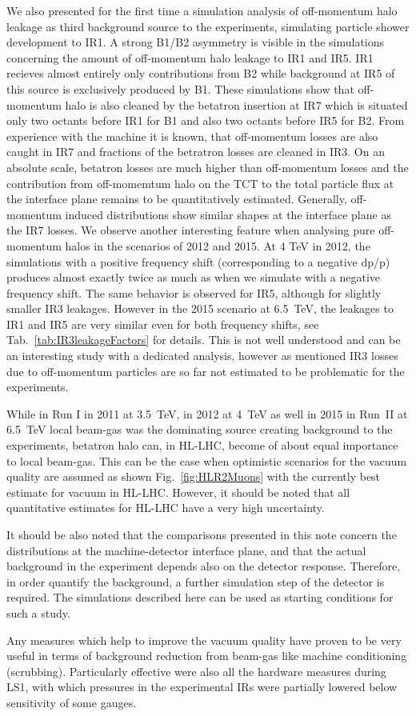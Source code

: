 We also presented for the first time a simulation analysis of off-momentum halo leakage as third background source to the experiments, simulating particle shower development to IR1. A strong B1/B2 asymmetry is visible in the simulations concerning the amount of off-momentum halo leakage to IR1 and IR5. IR1 recieves almost entirely only contributions from B2 while background at IR5 of this source is exclusively produced by B1. These simulations show that off-momentum halo is also cleaned by the betatron insertion at IR7 which is situated only two octants before IR1 for B1 and also two octants before IR5 for B2. From experience with the machine it is known, that off-momentum losses are also caught in IR7 and fractions of the betratron losses are cleaned in IR3. On an absolute scale, betatron losses are much higher than off-momentum losses and the contribution from off-momemtum halo on the TCT to the total particle flux at the interface plane remains to be quantitatively estimated.
Generally, off-momentum induced distributions show similar shapes at the interface plane as the IR7 losses. We observe another interesting feature when analysing pure off-momentum halos in the scenarios of 2012 and 2015. At 4 TeV in 2012, the simulations with a positive frequency shift (corresponding to a negative dp/p) produces almost exactly twice as much as when we simulate with a negative frequency shift. The same behavior is observed for IR5, although for slightly smaller IR3 leakages. However in the 2015 scenario at 6.5~TeV, the leakages to IR1 and IR5 are very similar even for both frequency shifts, see Tab.~\ref{tab:IR3leakageFactors} for details. This is not well understood and can be an interesting study with a dedicated analysis, however as mentioned IR3 losses due to off-momentum particles are so far not estimated to be problematic for the experiments. 


While in Run I in 2011 at 3.5~TeV, in 2012 at 4~TeV as well in 2015 in Run~II at 6.5~TeV local beam-gas was the dominating source creating background to the experiments, betatron halo can, in HL-LHC, become of about equal importance to local beam-gas. This can be the case when optimistic scenarios for the vacuum quality are assumed as shown Fig.~\ref{fig:HLR2Muons} with the currently best estimate for vacuum in HL-LHC. However, it should be noted that all quantitative estimates for HL-LHC have a very high uncertainty.

It should be also noted that the comparisons presented in this note concern the distributions at the machine-detector interface plane, and that the actual background in the experiment depends also on the detector response. Therefore, in order quantify the background, a further simulation step of the detector is required. The simulations described here can be used as starting conditions for such a study.

Any measures which help to improve the vacuum quality have proven to be very useful in terms of background reduction from beam-gas like machine conditioning (scrubbing). Particularly effective were also all the hardware measures during LS1, with which pressures in the experimental IRs were partially lowered below sensitivity of some gauges.


